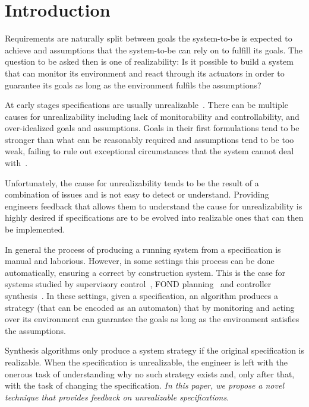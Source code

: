 \section{Introduction}


Requirements are naturally split between goals the system-to-be is expected to achieve and
assumptions that the system-to-be can rely on to fulfill its goals\cite{Jackson:1995,Letier:2002}. The question to be asked then is one of realizability: Is it possible to build a system that can monitor its environment and react through its actuators in order to guarantee its goals as long as the environment fulfils the assumptions?

At early stages specifications are usually unrealizable~\cite{Letier:2002}. There can be multiple causes for unrealizability including lack of monitorability and controllability, and over-idealized goals and assumptions. Goals in their first formulations tend to be stronger than what can be reasonably required and assumptions tend to be too weak, failing to rule out exceptional circumstances that the system cannot deal with~\cite{vanLamsweerde:2000}. 

Unfortunately, the cause for unrealizability tends to be the result of a combination of issues and is not easy to detect or understand. Providing engineers feedback that allows them to understand the cause for unrealizability is highly desired if specifications are to be evolved into realizable ones that can then be implemented. 

In general the process of producing a running system from a specification is manual and laborious. However, in some settings this process can be done automatically, ensuring a correct by construction system. This is the case for systems studied by supervisory control~\cite{ramadge:1989}, FOND planning~\cite{daniele:2000} and controller synthesis~\cite{Maoz:2014,Bloem:2012}. 
In these settings, given a specification, an algorithm produces a strategy (that can be encoded as an automaton) that by monitoring and acting over its environment can guarantee the goals as long as the environment satisfies the assumptions. 

Synthesis algorithms only produce a system strategy if the original specification is realizable. 
When the specification is unrealizable, the engineer is left with the onerous task of understanding why no such strategy exists and, only after that, with the task of changing the specification.
\emph{In this paper, we propose a novel technique that provides feedback on unrealizable specifications}. 

